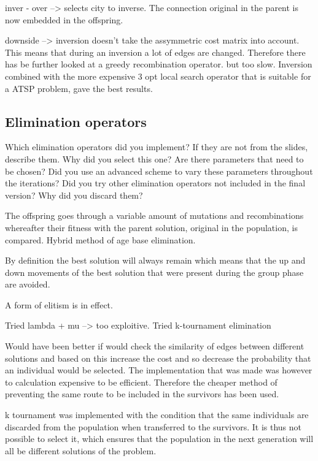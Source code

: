 \documentclass[a4paper,10pt]{article}
\newcommand{\ReplaceMe}[1]{{\color{blue}#1}}
\begin{document}
inver - over --> selects city to inverse. The connection original in the parent is now embedded in the offspring. 

downside --> inversion doesn't take the assymmetric cost matrix into account. This means that during an inversion a lot of edges are changed. Therefore there has be further looked at a greedy recombination operator. but too slow. Inversion combined with the more expensive 3 opt local search operator that is suitable for a ATSP problem, gave the best results. 





\subsection{Elimination operators}

\ReplaceMe{Which elimination operators did you implement? If they are not from the slides, describe them. Why did you select this one? Are there parameters that need to be chosen? Did you use an advanced scheme to vary these parameters throughout the iterations? Did you try other elimination operators not included in the final version? Why did you discard them?} 

The offspring goes through a variable amount of mutations and recombinations whereafter their fitness with the parent solution, original in the population, is compared. Hybrid method of age base elimination.

By definition the best solution will always remain which means that the up and down movements of the best solution that were present during the group phase are avoided.  

A form of elitism  is in effect.

Tried lambda + mu --> too exploitive. 
Tried k-tournament elimination

Would have been better if would check the similarity of edges between different solutions and based on this increase the cost and so decrease the probability that an individual would be selected. The implementation that was made was however to calculation expensive to be efficient. Therefore the cheaper method of preventing the same route to be included in the survivors has been used. 

k tournament was implemented with the condition that the same individuals are discarded from the population when transferred to the survivors. It is thus not possible to select it, which ensures that the population in the next generation will all be different solutions of the problem. 
\end{document}
